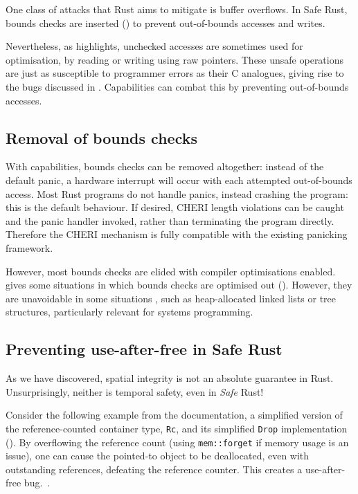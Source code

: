 \documentclass[dissertation.tex]{subfiles}
\begin{document}
One class of attacks that Rust aims to mitigate is buffer overflows.
In Safe Rust, bounds checks are inserted ()
to prevent out-of-bounds accesses and writes.

Nevertheless, as  highlights, unchecked accesses
are sometimes used for optimisation, by reading or writing using raw
pointers.
These unsafe operations are just as susceptible to programmer errors as
their C analogues, giving rise to the bugs discussed in
.
Capabilities can combat this by preventing out-of-bounds accesses.


\subsection{Removal of bounds checks}
\label{sec:eval-rust-bounds}

With capabilities, bounds checks can be removed altogether: instead of
the default panic, a hardware interrupt will occur with each attempted
out-of-bounds access.
Most Rust programs do not handle panics, instead crashing the program:
this is the default behaviour.
If desired, CHERI length violations can be caught and the panic handler
invoked, rather than terminating the program directly.
Therefore the CHERI mechanism is fully compatible with the existing
panicking framework.

However, most bounds checks are elided with compiler optimisations
enabled.
 gives some situations in which bounds checks are
optimised out ().
However, they are unavoidable in some situations , such as
heap-allocated linked lists or tree structures, particularly relevant
for systems programming.


\subsection{Preventing use-after-free in Safe Rust}
\label{sec:eval-rust-use-after-free}

As we have discovered, spatial integrity is not an absolute guarantee in
Rust.
Unsurprisingly, neither is temporal safety, even in \emph{Safe} Rust!

Consider the following example from the documentation, a simplified
version of the reference-counted container type, \texttt{Rc}, and its
simplified \texttt{Drop} implementation ().
By overflowing the reference count (using \texttt{mem::forget} if memory
usage is an issue), one can cause the pointed-to object to be
deallocated, even with outstanding references, defeating the reference
counter.
This creates a use-after-free bug.~\cite{rust-nomicon-rc-leak}.
\end{document}
